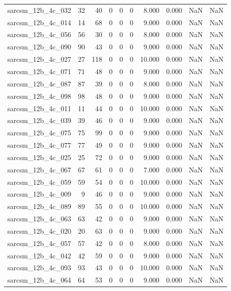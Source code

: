 \documentclass{article}
\begin{document}
\begin{longtable}{lrrrrrrrrr}
sarcsm\_12b\_4c\_032 & 32 & 40 & 0 & 0 & 0 & 8.000 & 0.000 & NaN & NaN \\
sarcsm\_12b\_4c\_014 & 14 & 68 & 0 & 0 & 0 & 9.000 & 0.000 & NaN & NaN \\
sarcsm\_12b\_4c\_056 & 56 & 30 & 0 & 0 & 0 & 8.000 & 0.000 & NaN & NaN \\
sarcsm\_12b\_4c\_090 & 90 & 43 & 0 & 0 & 0 & 9.000 & 0.000 & NaN & NaN \\
sarcsm\_12b\_4c\_027 & 27 & 118 & 0 & 0 & 0 & 10.000 & 0.000 & NaN & NaN \\
sarcsm\_12b\_4c\_071 & 71 & 48 & 0 & 0 & 0 & 9.000 & 0.000 & NaN & NaN \\
sarcsm\_12b\_4c\_087 & 87 & 39 & 0 & 0 & 0 & 8.000 & 0.000 & NaN & NaN \\
sarcsm\_12b\_4c\_098 & 98 & 48 & 0 & 0 & 0 & 9.000 & 0.000 & NaN & NaN \\
sarcsm\_12b\_4c\_011 & 11 & 44 & 0 & 0 & 0 & 10.000 & 0.000 & NaN & NaN \\
sarcsm\_12b\_4c\_039 & 39 & 46 & 0 & 0 & 0 & 9.000 & 0.000 & NaN & NaN \\
sarcsm\_12b\_4c\_075 & 75 & 99 & 0 & 0 & 0 & 9.000 & 0.000 & NaN & NaN \\
sarcsm\_12b\_4c\_077 & 77 & 49 & 0 & 0 & 0 & 9.000 & 0.000 & NaN & NaN \\
sarcsm\_12b\_4c\_025 & 25 & 72 & 0 & 0 & 0 & 9.000 & 0.000 & NaN & NaN \\
sarcsm\_12b\_4c\_067 & 67 & 61 & 0 & 0 & 0 & 7.000 & 0.000 & NaN & NaN \\
sarcsm\_12b\_4c\_059 & 59 & 54 & 0 & 0 & 0 & 10.000 & 0.000 & NaN & NaN \\
sarcsm\_12b\_4c\_009 & 9 & 46 & 0 & 0 & 0 & 9.000 & 0.000 & NaN & NaN \\
sarcsm\_12b\_4c\_089 & 89 & 55 & 0 & 0 & 0 & 10.000 & 0.000 & NaN & NaN \\
sarcsm\_12b\_4c\_063 & 63 & 42 & 0 & 0 & 0 & 9.000 & 0.000 & NaN & NaN \\
sarcsm\_12b\_4c\_020 & 20 & 63 & 0 & 0 & 0 & 9.000 & 0.000 & NaN & NaN \\
sarcsm\_12b\_4c\_057 & 57 & 42 & 0 & 0 & 0 & 8.000 & 0.000 & NaN & NaN \\
sarcsm\_12b\_4c\_042 & 42 & 59 & 0 & 0 & 0 & 9.000 & 0.000 & NaN & NaN \\
sarcsm\_12b\_4c\_093 & 93 & 43 & 0 & 0 & 0 & 10.000 & 0.000 & NaN & NaN \\
sarcsm\_12b\_4c\_064 & 64 & 53 & 0 & 0 & 0 & 9.000 & 0.000 & NaN & NaN \\

\end{longtable}
\end{document}
